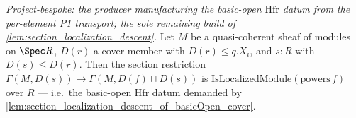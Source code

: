\begin{lemma}
  \label{lem:section_localization_hfr_basicOpen}
  \textit{Project-bespoke: the producer manufacturing the basic-open \(\mathrm{Hfr}\) datum from the
  per-element P1 transport; the sole remaining build of \cref{lem:section_localization_descent}.}
  Let \(M\) be a quasi-coherent sheaf of modules on \(\Spec R\), \(D(r)\) a cover member with
  \(D(r) \le q.X_i\), and \(s : R\) with \(D(s) \le D(r)\). Then the section restriction
  \(\Gamma(M, D(s)) \to \Gamma(M, D(f) \sqcap D(s))\) is
  \(\mathrm{IsLocalizedModule}(\mathrm{powers}\,f)\) over \(R\) --- i.e.\ the basic-open
  \(\mathrm{Hfr}\) datum demanded by \cref{lem:section_localization_descent_of_basicOpen_cover}.
\end{lemma}
